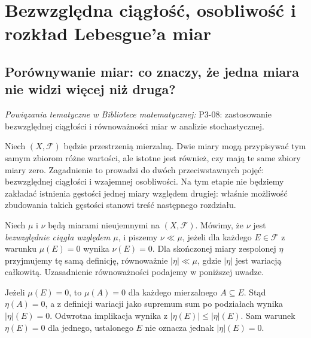 \chapter[Bezwzględna ciągłość i rozkład Lebesgue'a]{Bezwzględna ciągłość, osobliwość i rozkład Lebesgue'a miar}
\label{ch:ac-singular-17}

\providecommand{\atlasref}[2]{#2}


\section{Porównywanie miar: co znaczy, że jedna miara nie widzi więcej niż druga?}

\noindent\emph{Powiązania tematyczne w Bibliotece matematycznej:} \atlasref{P3-08::ch:girsanov}{P3-08: zastosowanie bezwzględnej ciągłości i równoważności miar w analizie stochastycznej}.

Niech $(X,\mathcal F)$ będzie przestrzenią mierzalną. Dwie miary mogą
przypisywać tym samym zbiorom różne wartości, ale istotne jest również,
czy mają te same zbiory miary zero. Zagadnienie to prowadzi do dwóch
przeciwstawnych pojęć: bezwzględnej ciągłości i wzajemnej osobliwości.
Na tym etapie nie będziemy zakładać istnienia gęstości jednej miary
względem drugiej: właśnie możliwość zbudowania takich gęstości
stanowi treść następnego rozdziału.

\begin{definicja}
\label{def:ac-measure-17}
Niech $\mu$ i $\nu$ będą miarami nieujemnymi na $(X,\mathcal F)$.
Mówimy, że $\nu$ jest \emph{bezwzględnie ciągła względem $\mu$},
i piszemy $\nu\ll\mu$, jeżeli dla każdego $E\in\mathcal F$
z warunku $\mu(E)=0$ wynika $\nu(E)=0$.
Dla skończonej miary zespolonej $\eta$ przyjmujemy tę samą definicję,
równoważnie $|\eta|\ll\mu$, gdzie $|\eta|$ jest wariacją całkowitą.
Uzasadnienie równoważności podajemy w poniższej uwadze.
\end{definicja}

\begin{uwaga}
Jeżeli $\mu(E)=0$, to $\mu(A)=0$ dla każdego mierzalnego $A\subseteq E$.
Stąd $\eta(A)=0$, a z definicji wariacji jako supremum sum po podziałach
wynika $|\eta|(E)=0$. Odwrotna implikacja wynika z
$|\eta(E)|\le|\eta|(E)$. Sam warunek $\eta(E)=0$ dla jednego,
ustalonego $E$ nie oznacza jednak $|\eta|(E)=0$.
\end{uwaga}

